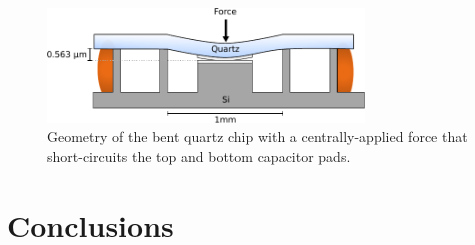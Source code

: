 \documentclass[double,12pt,1in,seploa]{beavtex}
\let\Oldsection\section
\renewcommand{\section}{\FloatBarrier\Oldsection}
\begin{document}
\begin{figure}
    \includegraphics[width = 0.75\textwidth]{quartz bending.pdf}
    \caption{Geometry of the bent quartz chip with a centrally-applied force that short-circuits the top and bottom capacitor pads.}
    \label{quartz bending}
\end{figure}


\section{Conclusions}
\end{document}
